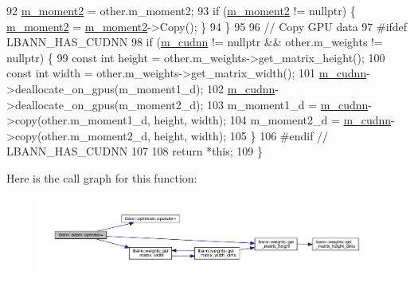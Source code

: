\begin{DoxyCode}
92     \hyperlink{classlbann_1_1adam_aea3295a0ee7da5e9c56fd6ff2f05c63f}{m\_moment2} = other.m\_moment2;
93     \textcolor{keywordflow}{if} (\hyperlink{classlbann_1_1adam_aea3295a0ee7da5e9c56fd6ff2f05c63f}{m\_moment2} != \textcolor{keyword}{nullptr}) \{ \hyperlink{classlbann_1_1adam_aea3295a0ee7da5e9c56fd6ff2f05c63f}{m\_moment2} = \hyperlink{classlbann_1_1adam_aea3295a0ee7da5e9c56fd6ff2f05c63f}{m\_moment2}->Copy(); \}
94   \}
95 
96   \textcolor{comment}{// Copy GPU data}
97 \textcolor{preprocessor}{  #ifdef LBANN\_HAS\_CUDNN}
98   \textcolor{keywordflow}{if} (\hyperlink{classlbann_1_1optimizer_a2f24dbeaca18b06f4aa7d179bbf96680}{m\_cudnn} != \textcolor{keyword}{nullptr} && other.m\_weights != \textcolor{keyword}{nullptr}) \{
99     \textcolor{keyword}{const} \textcolor{keywordtype}{int} height = other.m\_weights->get\_matrix\_height();
100     \textcolor{keyword}{const} \textcolor{keywordtype}{int} width = other.m\_weights->get\_matrix\_width();
101     \hyperlink{classlbann_1_1optimizer_a2f24dbeaca18b06f4aa7d179bbf96680}{m\_cudnn}->deallocate\_on\_gpus(m\_moment1\_d);
102     \hyperlink{classlbann_1_1optimizer_a2f24dbeaca18b06f4aa7d179bbf96680}{m\_cudnn}->deallocate\_on\_gpus(m\_moment2\_d);
103     m\_moment1\_d = \hyperlink{classlbann_1_1optimizer_a2f24dbeaca18b06f4aa7d179bbf96680}{m\_cudnn}->copy(other.m\_moment1\_d, height, width);
104     m\_moment2\_d = \hyperlink{classlbann_1_1optimizer_a2f24dbeaca18b06f4aa7d179bbf96680}{m\_cudnn}->copy(other.m\_moment2\_d, height, width);
105   \}
106 \textcolor{preprocessor}{  #endif // LBANN\_HAS\_CUDNN}
107 
108   \textcolor{keywordflow}{return} *\textcolor{keyword}{this};
109 \}
\end{DoxyCode}
Here is the call graph for this function\+:\nopagebreak
\begin{figure}[H]
\begin{center}
\leavevmode
\includegraphics[width=350pt]{classlbann_1_1adam_a00051b788b2bb34102a6bad5a380fc85_cgraph}
\end{center}
\end{figure}
\mbox{\label{classlbann_1_1adam_a43e941b596c5d1cc68b795b0399398c4}} 
